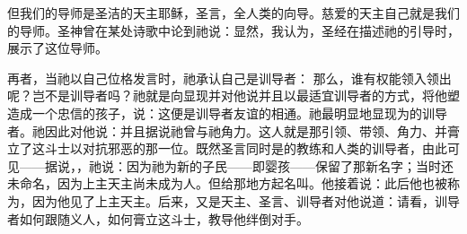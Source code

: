但我们的导师是圣洁的天主耶稣，圣言，全人类的向导。慈爱的天主自己就是我们的导师。圣神曾在某处诗歌中论到祂说：显然，我认为，圣经在描述祂的引导时，展示了这位导师。\par

再者，当祂以自己位格发言时，祂承认自己是训导者： 那么，谁有权能领入领出呢？岂不是训导者吗？祂就是向显现并对他说并且以最适宜训导者的方式，将他塑造成一个忠信的孩子，说：这便是训导者友谊的相通。祂最明显地显现为的训导者。祂因此对他说：并且据说祂曾与祂角力。这人就是那引领、带领、角力、并膏立了这斗士以对抗邪恶的那一位。既然圣言同时是的教练和人类的训导者，由此可见——据说，，祂说：因为祂为新的子民——即婴孩——保留了那新名字；当时还未命名，因为上主天主尚未成为人。但给那地方起名叫。他接着说：此后他也被称为，因为他见了上主天主。后来，又是天主、圣言、训导者对他说道：请看，训导者如何跟随义人，如何膏立这斗士，教导他绊倒对手。\par

